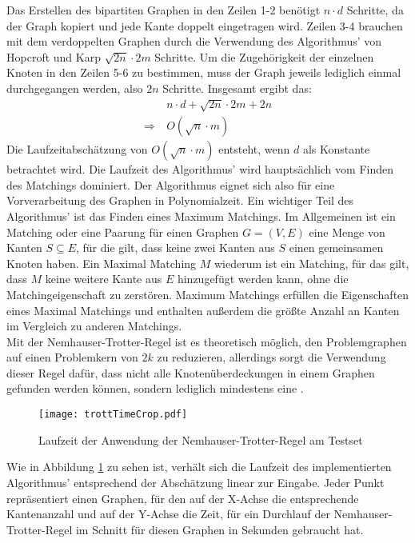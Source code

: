 Das Erstellen des bipartiten Graphen in den Zeilen 1-2 benötigt $n \cdot d$ Schritte, da der Graph kopiert und jede Kante doppelt eingetragen wird. Zeilen 3-4 brauchen mit dem verdoppelten Graphen durch die Verwendung des Algorithmus' von Hopcroft und Karp $\sqrt{2n} \cdot 2m$ Schritte. Um die Zugehörigkeit der einzelnen Knoten in den Zeilen 5-6 zu bestimmen, muss der Graph jeweils lediglich einmal durchgegangen werden, also $2n$ Schritte. Insgesamt ergibt das:
\begin{align}
&\ n \cdot d + \sqrt{2n} \cdot 2m + 2n\\
\Rightarrow &\ O(\sqrt{n} \cdot m)
\end{align}
Die Laufzeitabschätzung von  $O(\sqrt{n} \cdot m)$ entsteht, wenn $d$ als Konstante betrachtet wird. Die Laufzeit des Algorithmus' wird hauptsächlich vom Finden des Matchings dominiert. Der Algorithmus eignet sich also für eine Vorverarbeitung des Graphen in Polynomialzeit.
Ein wichtiger Teil des Algorithmus' ist das Finden eines Maximum Matchings. Im Allgemeinen ist ein Matching oder eine Paarung für einen Graphen $G=(V,E)$ eine Menge von Kanten $S \subseteq E$, für die gilt, dass keine zwei Kanten aus $S$ einen gemeinsamen Knoten haben. Ein Maximal Matching $M$ wiederum ist ein Matching, für das gilt, dass $M$ keine weitere Kante aus $E$ hinzugefügt werden kann, ohne die Matchingeigenschaft zu zerstören. Maximum Matchings erfüllen die Eigenschaften eines Maximal Matchings und enthalten außerdem die größte Anzahl an Kanten im Vergleich zu anderen Matchings.\\
Mit der Nemhauser-Trotter-Regel ist es theoretisch möglich, den Problemgraphen auf einen Problemkern von $2k$ zu reduzieren, allerdings sorgt die Verwendung dieser Regel dafür, dass nicht alle Knotenüberdeckungen in einem Graphen gefunden werden können, sondern lediglich mindestens eine \cite{fixed}.
\begin{figure}[htb]
\centering
  	{\texttt{[image: trottTimeCrop.pdf]}}
	\caption{Laufzeit der Anwendung der Nemhauser-Trotter-Regel am Testset\label{fig:trottTime}}
\centering
\end{figure}Wie in Abbildung \ref{fig:trottTime} zu sehen ist, verhält sich die Laufzeit des implementierten Algorithmus' entsprechend der Abschätzung linear zur Eingabe. Jeder Punkt repräsentiert einen Graphen, für den auf der X-Achse die entsprechende Kantenanzahl und auf der Y-Achse die Zeit, für ein Durchlauf der Nemhauser-Trotter-Regel im Schnitt für diesen Graphen in Sekunden gebraucht hat.
